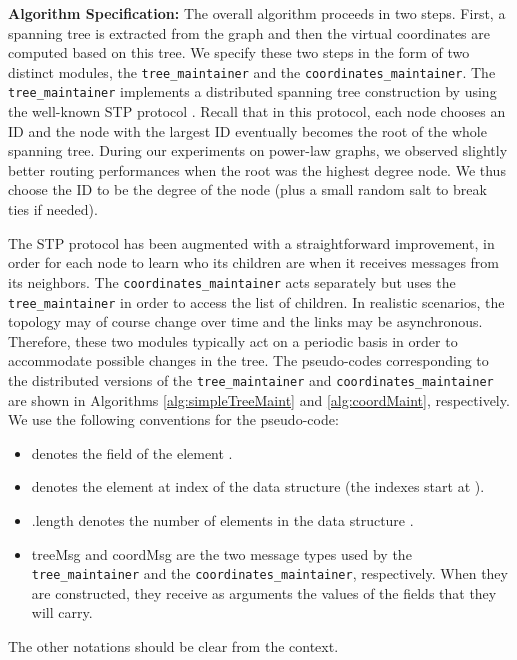 \documentclass[conference]{IEEEtran}
\begin{document}
\textbf{Algorithm Specification: }
The overall algorithm proceeds in two steps. First, a spanning tree is extracted from the graph and then the virtual coordinates are computed based on this tree. We specify these two steps in the form of two distinct modules, the \texttt{tree\_maintainer} and the \texttt{coordinates\_maintainer}. The \texttt{tree\_maintainer} implements a distributed spanning tree construction by using the well-known STP protocol \cite{perlman:stp}. Recall that in this protocol, each node chooses an ID and the node with the largest ID eventually becomes the root of the whole spanning tree. 
During our experiments on power-law graphs, we observed slightly better routing performances when the root was the highest degree node. We thus choose the ID to be the degree of the node (plus a small random salt to break ties if needed).
 
The STP protocol has been augmented with a straightforward improvement, in order for each node to learn who its children are when it receives messages from its neighbors. The \texttt{coordinates\_maintainer} acts separately but uses the \texttt{tree\_maintainer} in order to access the list of children.
In realistic scenarios, the topology may of course 
change over time and the links may be asynchronous. Therefore, these two modules typically act on a periodic basis in order to accommodate possible changes in the tree. The pseudo-codes corresponding to the distributed versions of the \texttt{tree\_maintainer} and \texttt{coordinates\_maintainer} are shown in Algorithms \ref{alg:simpleTreeMaint} and \ref{alg:coordMaint}, respectively. 
We use the following conventions for the pseudo-code:
\begin{itemize}
\item  denotes the field  of the element .
\item  denotes the element at index  of the data structure  (the indexes start at ).
\item .length denotes the number of elements in the data structure .
\item treeMsg and coordMsg are the two message types used by the \texttt{tree\_maintainer} and the \texttt{coordinates\_maintainer}, respectively. When they are constructed, they receive as arguments the values of the fields that they will carry.
\end{itemize}
The other notations should be clear from the context.
\end{document}
